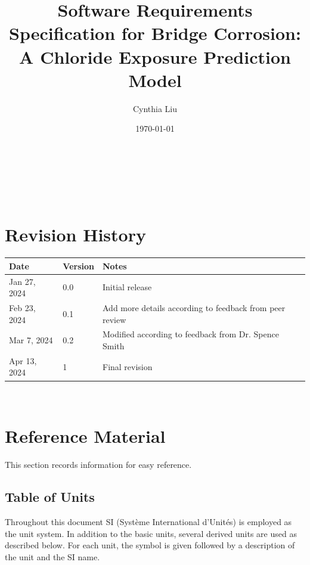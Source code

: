\documentclass[12pt]{article}
\begin{document}
\title{Software Requirements Specification for Bridge Corrosion: A Chloride Exposure Prediction Model} 
\author{Cynthia Liu}
\date{\today}
	
\maketitle

~\newpage


\tableofcontents

~\newpage

\section*{Revision History}

\begin{tabularx}{\textwidth}{p{3cm}p{2cm}X}
\toprule {\bf Date} & {\bf Version} & {\bf Notes}\\
\midrule
Jan 27, 2024 & 0.0 & Initial release\\
Feb 23, 2024 & 0.1 & Add more details according to feedback from peer review\\
Mar 7, 2024 & 0.2 & Modified according to feedback from Dr. Spence Smith\\
Apr 13, 2024 & 1 & Final revision \\
\bottomrule
\end{tabularx}

~\newpage

\section{Reference Material}

This section records information for easy reference.

\subsection{Table of Units}

Throughout this document SI (Syst\`{e}me International d'Unit\'{e}s) is employed
as the unit system.  In addition to the basic units, several derived units are
used as described below.  For each unit, the symbol is given followed by a
description of the unit and the SI name.
~\newline
\end{document}
